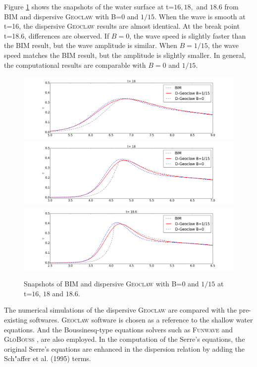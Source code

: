 \documentclass[review]{elsarticle}
\begin{document}
\fi

Figure \ref{fig:bim_dgeo} shows the snapshots of 
the water surface at t=$16, 18,$ and $18.6$
from BIM and dispersive \textsc{Geoclaw} with B=$0$ and $1/15$.
When the wave is smooth at t=16, the dispersive \textsc{Geoclaw}
results are almost identical. 
At the break point t=18.6, differences are observed. 
If $B=0$, the wave speed is slightly faster 
than the BIM result, but the wave amplitude is similar. 
When $B=1/15$, the wave speed matches the BIM result,
but the amplitude is slightly smaller. 
In general, the computational results are comparable
with $B=0$ and $1/15$. 

\begin{figure}[!htb]
\centering
\includegraphics[width=.9\textwidth]{_fig/bim_dgeo_160.png}\\
\includegraphics[width=.9\textwidth]{_fig/bim_dgeo_180.png}\\
\includegraphics[width=.9\textwidth]{_fig/bim_dgeo_186.png}
\caption{Snapshots of BIM and dispersive \textsc{Geoclaw} with B=$0$ and $1/15$ at t=$16$, $18$ and $18.6$.}
\label{fig:bim_dgeo}
\end{figure}

The numerical simulations of 
the dispersive \textsc{Geoclaw} are compared
with the pre-existing softwares. 
\textsc{Geoclaw} software \cite{clawpack} is chosen
as a reference to the shallow water equations.
And the Boussinesq-type equations solvers
such as \textsc{Funwave} \cite{shi2012high}
and \textsc{GloBouss} \cite{lovholt2010coupling}, are also employed. 
In the computation of the Serre's equations, 
the original Serre's equations are enhanced in the dispersion relation
by adding the Sch{"a}ffer et al. (1995) \cite{schaffer1995further} terms. 
\end{document}
